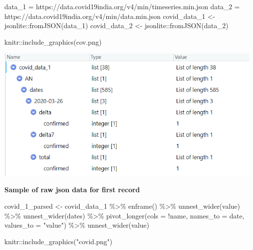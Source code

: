 \documentclass[
]{article}
\newenvironment{Shaded}{}{}
\newcommand{\AttributeTok}[1]{#1}
\newcommand{\FunctionTok}[1]{#1}
\newcommand{\NormalTok}[1]{#1}
\newcommand{\OtherTok}[1]{\textcolor[rgb]{1.00,0.25,0.00}{#1}}
\newcommand{\SpecialCharTok}[1]{\textcolor[rgb]{0.00,0.50,0.50}{#1}}
\newcommand{\StringTok}[1]{\textcolor[rgb]{0.01,0.42,0.03}{#1}}
\begin{document}
\begin{Shaded}
\begin{Highlighting}[]
\NormalTok{data\_1 }\OtherTok{=} \StringTok{\textquotesingle{}https://data.covid19india.org/v4/min/timeseries.min.json\textquotesingle{}}
\NormalTok{data\_2 }\OtherTok{=} \StringTok{\textquotesingle{}https://data.covid19india.org/v4/min/data.min.json\textquotesingle{}}
\NormalTok{covid\_data\_1 }\OtherTok{\textless{}{-}}\NormalTok{ jsonlite}\SpecialCharTok{::}\FunctionTok{fromJSON}\NormalTok{(data\_1)}
\NormalTok{covid\_data\_2 }\OtherTok{\textless{}{-}}\NormalTok{ jsonlite}\SpecialCharTok{::}\FunctionTok{fromJSON}\NormalTok{(data\_2)}

\NormalTok{knitr}\SpecialCharTok{::}\FunctionTok{include\_graphics}\NormalTok{(}\StringTok{\textquotesingle{}cov.png\textquotesingle{}}\NormalTok{)}
\end{Highlighting}
\end{Shaded}

\includegraphics[width=0.6\linewidth]{cov}

\textbf{Sample of raw json data for first record}

\begin{Shaded}
\begin{Highlighting}[]
\NormalTok{covid\_1\_parsed }\OtherTok{\textless{}{-}}
\NormalTok{  covid\_data\_1 }\SpecialCharTok{\%\textgreater{}\%} \FunctionTok{enframe}\NormalTok{() }\SpecialCharTok{\%\textgreater{}\%} \FunctionTok{unnest\_wider}\NormalTok{(value) }\SpecialCharTok{\%\textgreater{}\%} \FunctionTok{unnest\_wider}\NormalTok{(dates) }\SpecialCharTok{\%\textgreater{}\%} 
  \FunctionTok{pivot\_longer}\NormalTok{(}\AttributeTok{cols =} \SpecialCharTok{!}\NormalTok{name,}
               \AttributeTok{names\_to =} \StringTok{\textquotesingle{}date\textquotesingle{}}\NormalTok{,}
               \AttributeTok{values\_to =} \StringTok{"value"}\NormalTok{) }\SpecialCharTok{\%\textgreater{}\%} \FunctionTok{unnest\_wider}\NormalTok{(value)}

\NormalTok{knitr}\SpecialCharTok{::}\FunctionTok{include\_graphics}\NormalTok{(}\StringTok{"covid.png"}\NormalTok{)}
\end{Highlighting}
\end{Shaded}
\end{document}
